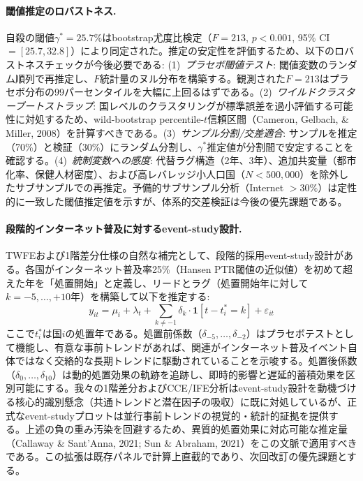 \documentclass[a4paper,11pt,titlepage]{article}
\begin{document}
\paragraph{閾値推定のロバストネス.}
自殺の閾値$\gamma^* = 25.7\%$はbootstrap尤度比検定（$F = 213$, $p < 0.001$, 95\% CI $= [25.7, 32.8]$）により同定された。推定の安定性を評価するため、以下のロバストネスチェックが今後必要である: (1)~\textit{プラセボ閾値テスト}: 閾値変数のランダム順列で再推定し、$F$統計量のヌル分布を構築する。観測された$F = 213$はプラセボ分布の99パーセンタイルを大幅に上回るはずである。(2)~\textit{ワイルドクラスターブートストラップ}: 国レベルのクラスタリングが標準誤差を過小評価する可能性に対処するため、wild-bootstrap percentile-$t$信頼区間（Cameron, Gelbach, \& Miller, 2008）を計算すべきである。(3)~\textit{サンプル分割/交差適合}: サンプルを推定（70\%）と検証（30\%）にランダム分割し、$\gamma^*$推定値が分割間で安定することを確認する。(4)~\textit{統制変数への感度}: 代替ラグ構造（2年、3年）、追加共変量（都市化率、保健人材密度）、および高レバレッジ小人口国（$N < 500{,}000$）を除外したサブサンプルでの再推定。予備的サブサンプル分析（Internet $> 30\%$）は定性的に一致した閾値推定値を示すが、体系的交差検証は今後の優先課題である。

\paragraph{段階的インターネット普及に対するevent-study設計.}
TWFEおよび1階差分仕様の自然な補完として、段階的採用event-study設計がある。各国がインターネット普及率25\%（Hansen PTR閾値の近似値）を初めて超えた年を「処置開始」と定義し、リードとラグ（処置開始年に対して$k = -5, \ldots, +10$年）を構築して以下を推定する:
\begin{equation}
y_{it} = \mu_i + \lambda_t + \sum_{k \neq -1} \delta_k \cdot \mathbf{1}[t - t_i^* = k] + \varepsilon_{it}
\label{eq:event-study}
\end{equation}
ここで$t_i^*$は国$i$の処置年である。処置前係数（$\delta_{-5}, \ldots, \delta_{-2}$）はプラセボテストとして機能し、有意な事前トレンドがあれば、関連がインターネット普及イベント自体ではなく交絡的な長期トレンドに駆動されていることを示唆する。処置後係数（$\delta_0, \ldots, \delta_{10}$）は動的処置効果の軌跡を追跡し、即時的影響と遅延的蓄積効果を区別可能にする。我々の1階差分およびCCE/IFE分析はevent-study設計を動機づける核心的識別懸念（共通トレンドと潜在因子の吸収）に既に対処しているが、正式なevent-studyプロットは並行事前トレンドの視覚的・統計的証拠を提供する。上述の負の重み汚染を回避するため、異質的処置効果に対応可能な推定量（Callaway \& Sant'Anna, 2021; Sun \& Abraham, 2021）をこの文脈で適用すべきである。この拡張は既存パネルで計算上直截的であり、次回改訂の優先課題とする。
\end{document}
